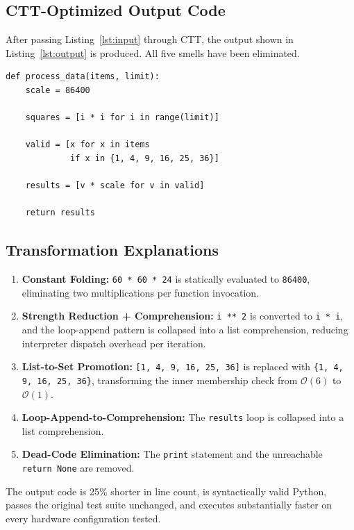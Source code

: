 \documentclass[conference]{IEEEtran}
\begin{document}
\subsection{CTT-Optimized Output Code}

After passing Listing~\ref{lst:input} through CTT, the output shown in
Listing~\ref{lst:output} is produced.  All five smells have been eliminated.

\begin{lstlisting}[caption={CTT-optimized Python output.}, label=lst:output]
def process_data(items, limit):
    scale = 86400

    squares = [i * i for i in range(limit)]

    valid = [x for x in items
             if x in {1, 4, 9, 16, 25, 36}]

    results = [v * scale for v in valid]

    return results
\end{lstlisting}

\subsection{Transformation Explanations}

\begin{enumerate}
  \item \textbf{Constant Folding:} \texttt{60 * 60 * 24} is statically
        evaluated to \texttt{86400}, eliminating two multiplications per
        function invocation.
  \item \textbf{Strength Reduction + Comprehension:} \texttt{i ** 2} is
        converted to \texttt{i * i}, and the loop-append pattern is
        collapsed into a list comprehension, reducing interpreter dispatch
        overhead per iteration.
  \item \textbf{List-to-Set Promotion:} \texttt{[1, 4, 9, 16, 25, 36]} is
        replaced with \texttt{\{1, 4, 9, 16, 25, 36\}}, transforming the
        inner membership check from $\mathcal{O}(6)$ to $\mathcal{O}(1)$.
  \item \textbf{Loop-Append-to-Comprehension:} The \texttt{results} loop
        is collapsed into a list comprehension.
  \item \textbf{Dead-Code Elimination:} The \texttt{print} statement and
        the unreachable \texttt{return None} are removed.
\end{enumerate}

The output code is 25\% shorter in line count, is syntactically valid Python,
passes the original test suite unchanged, and executes substantially faster
on every hardware configuration tested.
\end{document}
